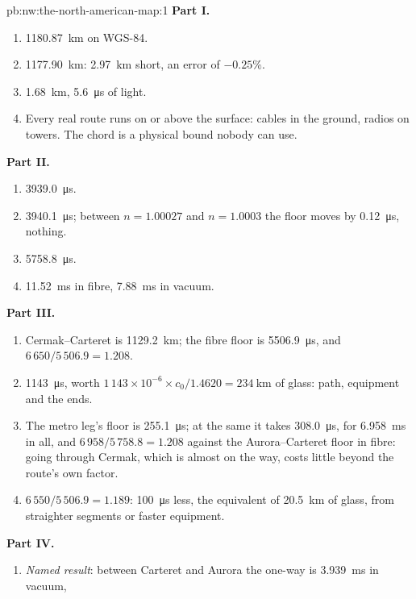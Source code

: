 \begin{solution}{pb:nw:the-north-american-map:1}
\textbf{Part I.}
\begin{enumerate}
\item \qty{1180.87}{\kilo\metre} on WGS-84.
\item \qty{1177.90}{\kilo\metre}: \qty{2.97}{\kilo\metre} short, an error of $-0.25\%$.
\item \qty{1.68}{\kilo\metre}, \qty{5.6}{\micro\second} of light.
\item Every real route runs on or above the surface: cables in the ground, radios on towers. The chord is a physical bound nobody can use.
\end{enumerate}
\textbf{Part II.}
\begin{enumerate}[resume]
\item \qty{3939.0}{\micro\second}.
\item \qty{3940.1}{\micro\second}; between $n = 1.00027$ and $n = 1.0003$ the floor moves by \qty{0.12}{\micro\second}, nothing.
\item \qty{5758.8}{\micro\second}.
\item \qty{11.52}{\milli\second} in fibre, \qty{7.88}{\milli\second} in vacuum.
\end{enumerate}
\textbf{Part III.}
\begin{enumerate}[resume]
\item Cermak--Carteret is \qty{1129.2}{\kilo\metre}; the fibre floor is \qty{5506.9}{\micro\second}, and $6\,650/5\,506.9 = 1.208$.
\item \qty{1143}{\micro\second}, worth $1\,143 \times 10^{-6} \times c_0/1.4620 = \qty{234}{\kilo\metre}$ of glass: path, equipment and the ends.
\item The metro leg's floor is \qty{255.1}{\micro\second}; at the same  it takes \qty{308.0}{\micro\second}, for
\qty{6.958}{\milli\second} in all, and $6\,958/5\,758.8 = 1.208$ against the Aurora--Carteret floor in fibre: going through Cermak, which
is almost on the way, costs little beyond the route's own factor.
\item $6\,550/5\,506.9 = 1.189$: \qty{100}{\micro\second} less, the equivalent of \qty{20.5}{\kilo\metre} of glass, from straighter segments or
faster equipment.
\end{enumerate}
\textbf{Part IV.}
\begin{enumerate}[resume]
\item \emph{Named result}: between Carteret and Aurora the one-way  is \qty{3.939}{\milli\second} in vacuum,

\end{enumerate}
\end{solution}
